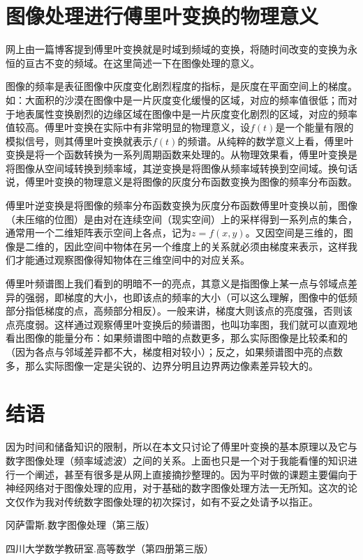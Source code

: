 \documentclass[UTF8,a4paper]{ctexart}
\begin{document}
\section{图像处理进行傅里叶变换的物理意义}
 网上由一篇博客提到傅里叶变换就是时域到频域的变换，将随时间改变的变换为永恒的亘古不变的频域。在这里简述一下在图像处理的意义。\par
 图像的频率是表征图像中灰度变化剧烈程度的指标，是灰度在平面空间上的梯度。如：大面积的沙漠在图像中是一片灰度变化缓慢的区域，对应的频率值很低；而对于地表属性变换剧烈的边缘区域在图像中是一片灰度变化剧烈的区域，对应的频率值较高。傅里叶变换在实际中有非常明显的物理意义，设$f(t)$是一个能量有限的模拟信号，则其傅里叶变换就表示$f(t)$的频谱。从纯粹的数学意义上看，傅里叶变换是将一个函数转换为一系列周期函数来处理的。从物理效果看，傅里叶变换是将图像从空间域转换到频率域，其逆变换是将图像从频率域转换到空间域。换句话说，傅里叶变换的物理意义是将图像的灰度分布函数变换为图像的频率分布函数。\par
 傅里叶逆变换是将图像的频率分布函数变换为灰度分布函数傅里叶变换以前，图像（未压缩的位图）是由对在连续空间（现实空间）上的采样得到一系列点的集合，通常用一个二维矩阵表示空间上各点，记为$z=f(x,y)$。又因空间是三维的，图像是二维的，因此空间中物体在另一个维度上的关系就必须由梯度来表示，这样我们才能通过观察图像得知物体在三维空间中的对应关系。\par
 傅里叶频谱图上我们看到的明暗不一的亮点，其意义是指图像上某一点与邻域点差异的强弱，即梯度的大小，也即该点的频率的大小（可以这么理解，图像中的低频部分指低梯度的点，高频部分相反）。一般来讲，梯度大则该点的亮度强，否则该点亮度弱。这样通过观察傅里叶变换后的频谱图，也叫功率图，我们就可以直观地看出图像的能量分布：如果频谱图中暗的点数更多，那么实际图像是比较柔和的（因为各点与邻域差异都不大，梯度相对较小）；反之，如果频谱图中亮的点数多，那么实际图像一定是尖锐的、边界分明且边界两边像素差异较大的。

\section{结语}
因为时间和储备知识的限制，所以在本文只讨论了傅里叶变换的基本原理以及它与数字图像处理（频率域滤波）之间的关系。上面也只是一个对于我能看懂的知识进行一个阐述，甚至有很多是从网上直接摘抄整理的。因为平时做的课题主要偏向于神经网络对于图像处理的应用，对于基础的数字图像处理方法一无所知。这次的论文仅作为我对传统数字图像处理的初次探讨，如有不妥之处请予以指正。
\begin{thebibliography}{1}

冈萨雷斯.数字图像处理（第三版）

四川大学数学教研室.高等数学（第四册第三版）

\end{thebibliography}
\end{document}
